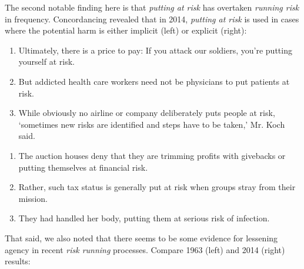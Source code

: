 The second notable finding here is that \emph{putting at risk} has overtaken \emph{running risk} in frequency. Concordancing revealed that in 2014, \emph{putting at risk} is used in cases where the potential harm is either implicit (left) or explicit (right):
%
\begin{multicols}{2}
\begin{enumerate}  [before=\color{black}\ttfamily] \setlength\itemsep{0em} \small
\item Ultimately, there is a price to pay: If you attack our soldiers, you're putting yourself at risk.
\item But addicted health care workers need not be physicians to put patients at risk.
\item While obviously no airline or company deliberately puts people at risk, `sometimes new risks are identified and steps have to be taken,' Mr. Koch said.
\end{enumerate}
%
\begin{enumerate}  [before=\color{black}\ttfamily] \setlength\itemsep{0em} \small
\item The auction houses deny that they are trimming profits with givebacks or putting themselves at financial risk.
\item Rather, such tax status is generally put at risk when groups stray from their mission.
\item They had handled her body, putting them at serious risk of infection.
\end{enumerate}
\end{multicols}
%
\noindent That said, we also noted that there seems to be some evidence for lessening agency in recent \emph{risk running} processes. Compare 1963 (left) and 2014 (right) results:

